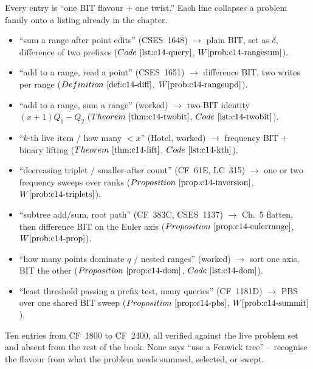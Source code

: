 
Every entry is ``one BIT flavour + one twist.'' Each line collapses a problem
family onto a listing already in the chapter.

\begin{itemize}[nosep, leftmargin=1.4em]
  \item ``sum a range after point edits'' (CSES~1648) \(\to\) plain BIT, set as
        \(\delta\), difference of two prefixes (\(\coderef{c14-query}\), \(\probref{c14-rangesum}\)).
  \item ``add to a range, read a point'' (CSES~1651) \(\to\) difference BIT, two
        writes per range (\(\defref{c14-diff}\), \(\probref{c14-rangeupd}\)).
  \item ``add to a range, sum a range'' (worked) \(\to\) two-BIT identity
        \((x{+}1)Q_1-Q_2\) (\(\thmref{c14-twobit}\), \(\coderef{c14-twobit}\)).
  \item ``\(k\)-th live item / how many \(<x\)'' (Hotel, worked) \(\to\) frequency
        BIT + binary lifting (\(\thmref{c14-lift}\), \(\coderef{c14-kth}\)).
  \item ``decreasing triplet / smaller-after count'' (CF~61E, LC~315) \(\to\) one
        or two frequency sweeps over ranks (\(\propref{c14-inversion}\), \(\probref{c14-triplets}\)).
  \item ``subtree add/sum, root path'' (CF~383C, CSES~1137) \(\to\) Ch.~5 flatten,
        then difference BIT on the Euler axis (\(\propref{c14-eulerrange}\), \(\probref{c14-prop}\)).
  \item ``how many points dominate \(q\) / nested ranges'' (worked) \(\to\) sort one
        axis, BIT the other (\(\propref{c14-dom}\), \(\coderef{c14-dom}\)).
  \item ``least threshold passing a prefix test, many queries'' (CF~1181D) \(\to\)
        PBS over one shared BIT sweep (\(\propref{c14-pbs}\), \(\probref{c14-summit}\)).
\end{itemize}


Ten entries from CF~1800 to CF~2400, all verified against the live problem set
and absent from the rest of the book. None says ``use a Fenwick tree'' --
recognise the flavour from what the problem needs summed, selected, or swept.

